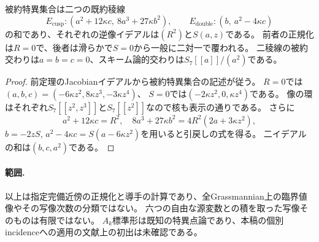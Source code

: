 \begin{corollary}
被約特異集合は二つの既約稜線
\[
 E_{\mathrm{cusp}}:(a^2+12\kappa c,\ 8a^3+27\kappa b^2),\qquad
 E_{\mathrm{double}}:(b,\ a^2-4\kappa c)
\]
の和であり、それぞれの逆像イデアルは$(R^2)$と$S(a,z)$である。
前者の正規化は$R=0$で、後者は滑らかで$S=0$から一般に二対一で覆われる。
二稜線の被約交わりは$a=b=c=0$、スキーム論的交わりは$S_7[[a]]/(a^2)$である。
\end{corollary}
\begin{proof}
前定理のJacobianイデアルから被約特異集合の記述が従う。
$R=0$では$(a,b,c)=(-6\kappa z^2,8\kappa z^3,-3\kappa z^4)$、
$S=0$では$(-2\kappa z^2,0,\kappa z^4)$である。
像の環はそれぞれ$S_7[[z^2,z^3]]$と$S_7[[z^2]]$なので核も表示の通りである。
さらに
\[
 a^2+12\kappa c=R^2,\quad8a^3+27\kappa b^2=4R^2(2a+3\kappa z^2),
\]
$b=-2zS$, $a^2-4\kappa c=S(a-6\kappa z^2)$を用いると引戻しの式を得る。
二イデアルの和は$(b,c,a^2)$である。
\end{proof}

\paragraph{範囲.}
以上は指定完備近傍の正規化と導手の計算であり、全Grassmannian上の臨界値像やその写像次数の分類ではない。
六つの自由な源変数との積を取った写像そのものは有限ではない。
$A_k$標準形は既知の特異点論であり、本稿の個別incidenceへの適用の文献上の初出は未確認である。
